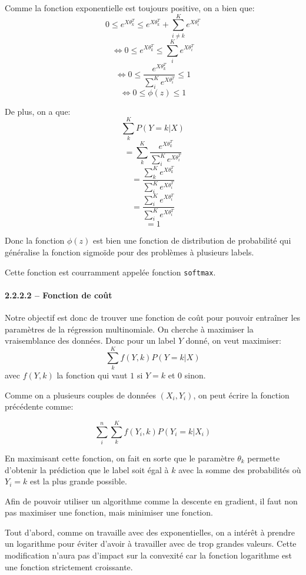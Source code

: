 \documentclass[
]{article}
\begin{document}
Comme la fonction exponentielle est toujours positive, on a bien que:
\[0 \leq e^{X \theta_k^T} \leq e^{X \theta_k^T} + \sum_{i \neq k}^K e^{X \theta_i^T}\]
\[\Leftrightarrow 0 \leq e^{X \theta_k^T} \leq \sum_{i}^K e^{X \theta_i^T}\]
\[\Leftrightarrow 0 \leq \frac{e^{X \theta_k^T}}{\sum_{i}^K e^{X \theta_i^T}} \leq 1\]
\[\Leftrightarrow 0 \leq \phi(z) \leq 1\]

De plus, on a que: \[\sum_k^K P(Y = k | X)\]
\[=\sum_k^K \frac{e^{X \theta_k^T}}{\sum_i^K e^{X \theta_i^T}}\]
\[=\frac{\sum_k^Ke^{X \theta_k^T}}{\sum_i^K e^{X \theta_i^T}}\]
\[=\frac{\sum_i^Ke^{X \theta_i^T}}{\sum_i^K e^{X \theta_i^T}}\] \[=1\]

Donc la fonction \(\phi(z)\) est bien une fonction de distribution de
probabilité qui généralise la fonction sigmoïde pour des problèmes à
plusieurs labels.

Cette fonction est courramment appelée fonction \texttt{softmax}.

\hypertarget{fonction-de-couxfbt-1}{%
\paragraph{2.2.2.2 -- Fonction de coût}\label{fonction-de-couxfbt-1}}

Notre objectif est donc de trouver une fonction de coût pour pouvoir
entraîner les paramètres de la régression multinomiale. On cherche à
maximiser la vraisemblance des données. Donc pour un label \(Y\) donné,
on veut maximiser: \[\sum_k^K f(Y, k) P(Y = k | X)\] avec \(f(Y, k)\) la
fonction qui vaut \(1\) si \(Y = k\) et \(0\) sinon.

Comme on a plusieurs couples de données \((X_i, Y_i)\), on peut écrire
la fonction précédente comme:

\[\sum_i^n\sum_k^K f(Y_i, k) P(Y_i = k | X_i)\]

En maximisant cette fonction, on fait en sorte que le paramètre
\(\theta_k\) permette d'obtenir la prédiction que le label soit égal à
\(k\) avec la somme des probabilités où \(Y_i = k\) est la plus grande
possible.

Afin de pouvoir utiliser un algorithme comme la descente en gradient, il
faut non pas maximiser une fonction, mais minimiser une fonction.

Tout d'abord, comme on travaille avec des exponentielles, on a intérêt à
prendre un logarithme pour éviter d'avoir à travailler avec de trop
grandes valeurs. Cette modification n'aura pas d'impact sur la convexité
car la fonction logarithme est une fonction strictement croissante.
\end{document}
